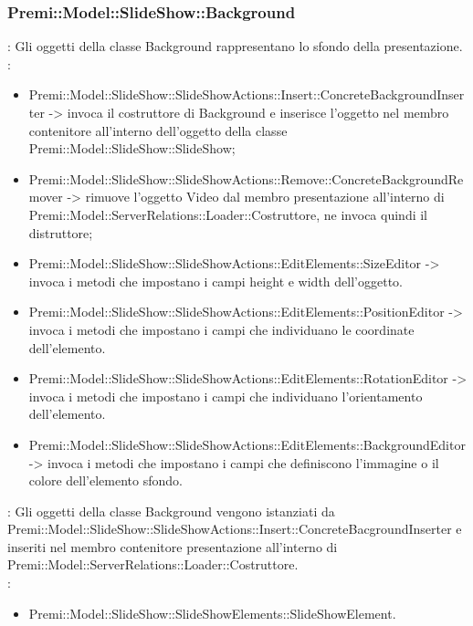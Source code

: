 {                 \subsubsection{Premi::Model::SlideShow::Background}{
                				\textbf{\tipo}: Gli oggetti della classe Background rappresentano lo sfondo della presentazione.\\
                				\textbf{\relaz}: 
                				\begin{itemize}
                					\item Premi::Model::SlideShow::SlideShowActions::Insert::ConcreteBackgroundInserter -> invoca il costruttore di Background e inserisce l’oggetto nel membro contenitore all’interno dell’oggetto della classe Premi::Model::SlideShow::SlideShow;
                                    \item Premi::Model::SlideShow::SlideShowActions::Remove::ConcreteBackgroundRemover -> rimuove l’oggetto Video dal membro presentazione all’interno di Premi::Model::ServerRelations::Loader::Costruttore, ne invoca quindi il distruttore;
                                    \item Premi::Model::SlideShow::SlideShowActions::EditElements::SizeEditor -> invoca i metodi che impostano i campi height e width dell'oggetto.
                    \item Premi::Model::SlideShow::SlideShowActions::EditElements::PositionEditor -> invoca i metodi che impostano i campi che individuano le coordinate dell'elemento.
                    \item Premi::Model::SlideShow::SlideShowActions::EditElements::RotationEditor -> invoca i metodi che impostano i campi che individuano l'orientamento dell'elemento.
                    \item Premi::Model::SlideShow::SlideShowActions::EditElements::BackgroundEditor -> invoca i metodi che impostano i campi che definiscono l'immagine o il colore dell'elemento sfondo.
                				\end{itemize}	
                                \textbf{\interfacce}: Gli oggetti della classe Background vengono istanziati da Premi::Model::SlideShow::SlideShowActions::Insert::ConcreteBacgroundInserter   e inseriti nel membro contenitore presentazione all’interno di Premi::Model::ServerRelations::Loader::Costruttore.\\
                                \textbf{\base}: 
                                    \begin{itemize}
                                    \item Premi::Model::SlideShow::SlideShowElements::SlideShowElement.
                                    \end{itemize}
                                    }              
}
